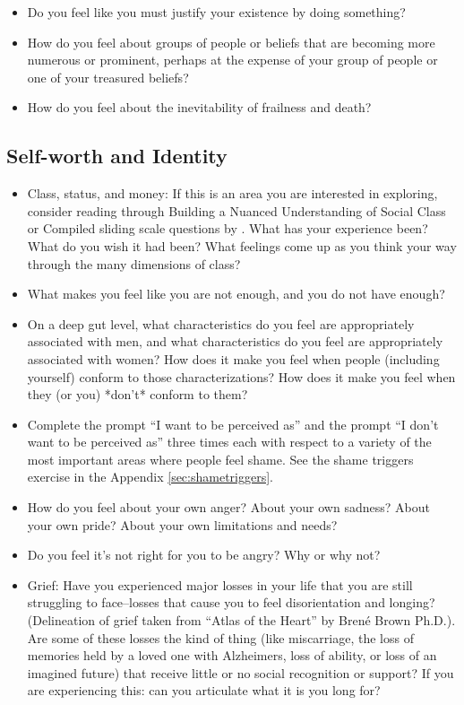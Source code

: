 \documentclass[12pt,letterpaper]{book}
\begin{document}
\begin{itemize}
    \item Do you feel like you must justify your existence by doing something?
    \item How do you feel about groups of people or beliefs that are becoming more numerous or prominent, perhaps at the expense of your group of people or one of your treasured beliefs?
    \item How do you feel about the inevitability of frailness and death?
\end{itemize}

\subsection*{Self-worth and Identity}
\begin{itemize}
    \item Class, status, and money: If this is an area you are interested in exploring, consider reading through Building a Nuanced Understanding of Social Class or Compiled sliding scale questions by \textcite{harperClass} . What has your experience been? What do you wish it had been? What feelings come up as you think your way through the many dimensions of class?
    \item  What makes you feel like you are not enough, and you do not have enough?
    \item  On a deep gut level, what characteristics do you feel are appropriately associated with men, and what characteristics do you feel are appropriately associated with women? How does it make you feel when people (including yourself) conform to those characterizations? How does it make you feel when they (or you) *don't* conform to them?
    \item  Complete the prompt “I want to be perceived as” and the prompt “I don't want to be perceived as” three times each with respect to a variety of the most important areas where people feel shame. See the shame triggers exercise in the Appendix \ref{sec:shametriggers}.
    \item  How do you feel about your own anger? About your own sadness? About your own pride? About your own limitations and needs?
    \item  Do you feel it's not right for you to be angry? Why or why not?
    \item  Grief: Have you experienced major losses in your life that you are still struggling to face–losses that cause you to feel disorientation and longing? (Delineation of grief taken from “Atlas of the Heart” by Brené Brown Ph.D.). Are some of these losses the kind of thing (like miscarriage, the loss of memories held by a loved one with Alzheimers, loss of ability, or loss of an imagined future) that receive little or no social recognition or support? If you are experiencing this: can you articulate what it is you long for?
\end{itemize}
\end{document}
